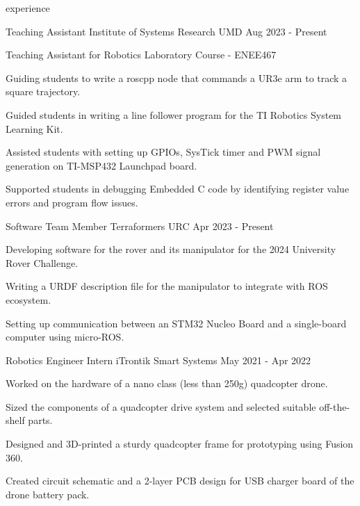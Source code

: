 \begin{section}{experience}

  \begin{work}
    {Teaching Assistant}
    {Institute of Systems Research}
    {UMD}
    {Aug 2023 - Present}

    \item Teaching Assistant for Robotics Laboratory Course - ENEE467
    \item Guiding students to write a roscpp node that commands a UR3e arm to track a square trajectory. 
    \item Guided students in writing a line follower program for the TI Robotics System Learning Kit.
    \item Assisted students with setting up GPIOs, SysTick timer and PWM signal generation on TI-MSP432 Launchpad board.
    \item Supported students in debugging Embedded C code by identifying register value errors and program flow issues.

  \end{work}

  \begin{work}
    {Software Team Member}
    {Terraformers URC}
    {}
    {Apr 2023 - Present}

    \item Developing software for the rover and its manipulator for the 2024 University Rover Challenge.
    \item Writing a URDF description file for the manipulator to integrate with ROS ecosystem.
    \item Setting up communication between an STM32 Nucleo Board and a single-board computer using micro-ROS.
  
  \end{work}

  \begin{work}
    {Robotics Engineer Intern}
    {iTrontik Smart Systems}
    {}
    {May 2021 - Apr 2022}

    \item Worked on the hardware of a nano class (less than 250g) quadcopter drone.
    \item Sized the components of a quadcopter drive system and selected suitable off-the-shelf parts.
    \item Designed and 3D-printed a sturdy quadcopter frame for prototyping using Fusion 360.
    \item Created circuit schematic and a 2-layer PCB design for USB charger board of the drone battery pack.
  
  \end{work}

\end{section}